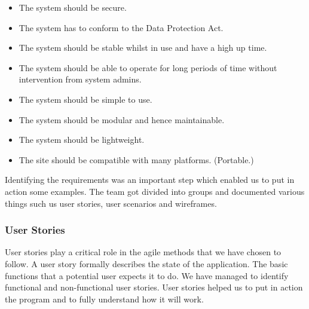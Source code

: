 \documentclass{l3proj}
\begin{document}
\begin{itemize}

\item The system should be secure.

\item The system has to conform to the Data Protection Act.

\item The system should be stable whilst in use and have a high up time.

\item The system should be able to operate for long periods of time without intervention from system admins.

\item The system should be simple to use.

\item The system should be modular and hence maintainable.

\item The system should be lightweight.

\item The site should be compatible with many platforms. (Portable.)

\end{itemize}

Identifying the requirements was an important step which enabled us to put in action some examples. The team got divided into groups and documented various things such us user stories, user scenarios and wireframes. 

\subsubsection{User Stories}
\label{user_stories}

User stories play a critical role in the agile methods that we have chosen to follow. A user story formally describes the state of the application. The basic functions that a potential user expects it to do. We have managed to identify functional and non-functional user stories. User stories helped us to put in action the program and to fully understand how it will work.
\end{document}
